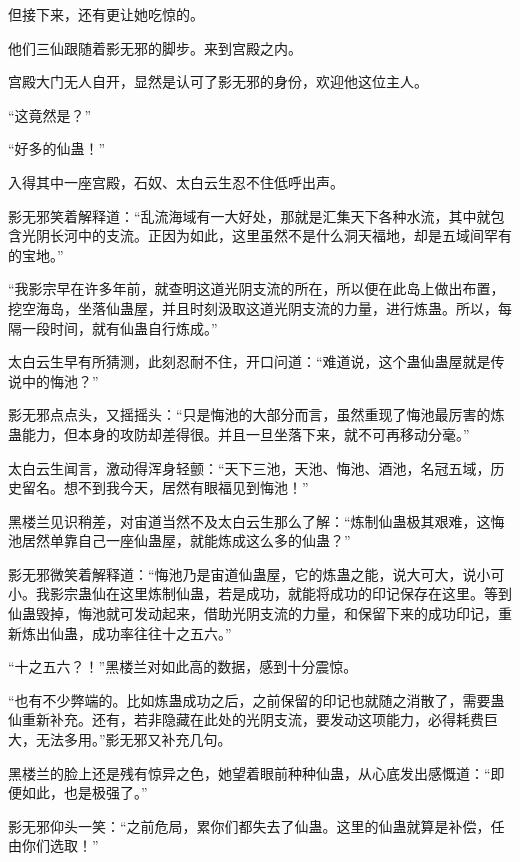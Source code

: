 \begin{this_body}
但接下来，还有更让她吃惊的。

他们三仙跟随着影无邪的脚步。来到宫殿之内。

宫殿大门无人自开，显然是认可了影无邪的身份，欢迎他这位主人。

“这竟然是？”

“好多的仙蛊！”

入得其中一座宫殿，石奴、太白云生忍不住低呼出声。

影无邪笑着解释道：“乱流海域有一大好处，那就是汇集天下各种水流，其中就包含光阴长河中的支流。正因为如此，这里虽然不是什么洞天福地，却是五域间罕有的宝地。”

“我影宗早在许多年前，就查明这道光阴支流的所在，所以便在此岛上做出布置，挖空海岛，坐落仙蛊屋，并且时刻汲取这道光阴支流的力量，进行炼蛊。所以，每隔一段时间，就有仙蛊自行炼成。”

太白云生早有所猜测，此刻忍耐不住，开口问道：“难道说，这个蛊仙蛊屋就是传说中的悔池？”

影无邪点点头，又摇摇头：“只是悔池的大部分而言，虽然重现了悔池最厉害的炼蛊能力，但本身的攻防却差得很。并且一旦坐落下来，就不可再移动分毫。”

太白云生闻言，激动得浑身轻颤：“天下三池，天池、悔池、酒池，名冠五域，历史留名。想不到我今天，居然有眼福见到悔池！”

黑楼兰见识稍差，对宙道当然不及太白云生那么了解：“炼制仙蛊极其艰难，这悔池居然单靠自己一座仙蛊屋，就能炼成这么多的仙蛊？”

影无邪微笑着解释道：“悔池乃是宙道仙蛊屋，它的炼蛊之能，说大可大，说小可小。我影宗蛊仙在这里炼制仙蛊，若是成功，就能将成功的印记保存在这里。等到仙蛊毁掉，悔池就可发动起来，借助光阴支流的力量，和保留下来的成功印记，重新炼出仙蛊，成功率往往十之五六。”

“十之五六？！”黑楼兰对如此高的数据，感到十分震惊。

“也有不少弊端的。比如炼蛊成功之后，之前保留的印记也就随之消散了，需要蛊仙重新补充。还有，若非隐藏在此处的光阴支流，要发动这项能力，必得耗费巨大，无法多用。”影无邪又补充几句。

黑楼兰的脸上还是残有惊异之色，她望着眼前种种仙蛊，从心底发出感慨道：“即便如此，也是极强了。”

影无邪仰头一笑：“之前危局，累你们都失去了仙蛊。这里的仙蛊就算是补偿，任由你们选取！”

\end{this_body}

